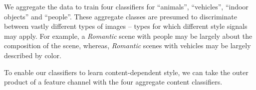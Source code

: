 We aggregate the data to train four classifiers for ``animals'', ``vehicles'', ``indoor objects'' and ``people''.
These aggregate classes are presumed to discriminate between vastly different types of images -- types for which different style signals may apply.
For example, a \emph{Romantic} scene with people may be largely about the composition of the scene, whereas, \emph{Romantic} scenes with vehicles may be largely described by color.

To enable our classifiers to learn content-dependent style, we can take the outer product of a feature channel with the four aggregate content classifiers.
